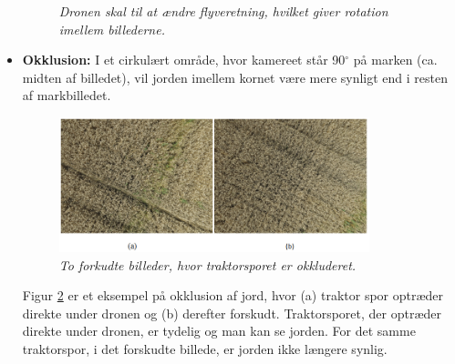 \begin{itemize}
{\begin{figure}[H]
     \vspace{-1em}
    \begin{center} 
       \caption{{\footnotesize \textit{Dronen skal til at ændre flyveretning, hvilket giver rotation imellem billederne.}}}
    \label{fig:rotation}
     \end{center}
     \vspace{-2.5em}
  \end{figure} \noindent}
\item{\textbf{Okklusion:}
I et cirkulært område, hvor kamereet står 90$^{\circ}$ på marken (ca. midten af billedet), vil jorden imellem kornet være mere synligt end i resten af markbilledet.
\begin{figure}[H]
    \centering
    \includegraphics[width=0.85\textwidth]{fig/18.png}
     \vspace{-1em}
    \begin{center}    
       \caption{{\footnotesize \textit{ To forkudte billeder, hvor traktorsporet er okkluderet. }}}
    \label{fig:okklusion}
     \end{center}
     \vspace{-2.5em}
  \end{figure} \noindent
Figur \ref{fig:okklusion} er et eksempel på okklusion af jord, hvor (a) traktor spor optræder direkte under dronen og (b) derefter forskudt. Traktorsporet, der optræder direkte under dronen, er tydelig og man kan se jorden. For det samme traktorspor, i det forskudte billede, er jorden ikke længere synlig.}
\end{itemize}
